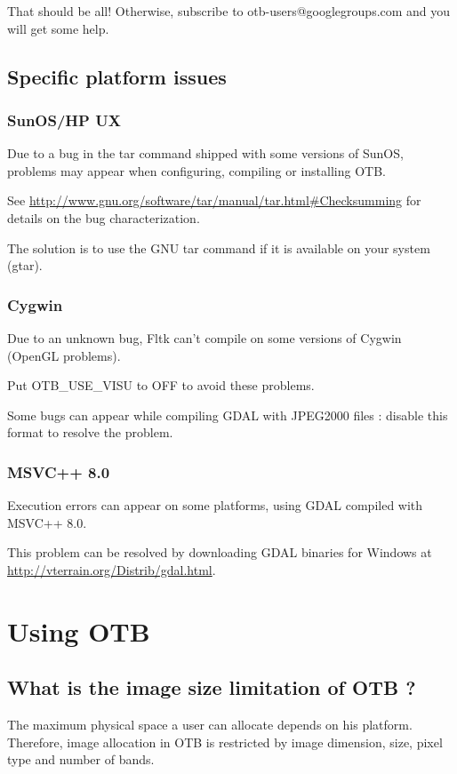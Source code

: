 That should be all! Otherwise, subscribe to
   otb-users@googlegroups.com and you will get some help.

\subsection{Specific platform issues}
\subsubsection{SunOS/HP UX}
Due to a bug in the tar command shipped with some versions of SunOS,
problems may appear when configuring, compiling or installing OTB.

See \url{http://www.gnu.org/software/tar/manual/tar.html#Checksumming} for
details on the bug characterization.

The solution is to use the GNU tar command if it is available on your
system (gtar).

\subsubsection{Cygwin}
Due to an unknown bug, Fltk can't compile on some versions of Cygwin (OpenGL problems).

Put OTB\_USE\_VISU to OFF to avoid these problems.

Some bugs can appear while compiling GDAL with JPEG2000 files : disable this format to resolve the problem.

\subsubsection{MSVC++ 8.0}
Execution errors can appear on some platforms, using GDAL compiled with MSVC++ 8.0.

This problem can be resolved by downloading GDAL binaries for Windows
at \url{http://vterrain.org/Distrib/gdal.html}.

\section{Using OTB}

\subsection{What is the image size limitation of OTB ?}

The maximum physical space a user can allocate depends on his platform. Therefore, 
image allocation in OTB is restricted by image dimension, size, pixel type and number 
of bands.

